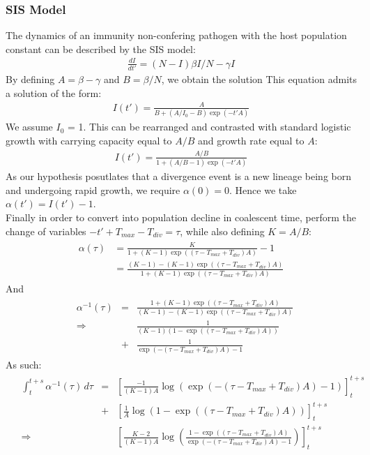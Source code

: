 \documentclass{report}
\theoremstyle{definition}
\begin{document}
\subsubsection{SIS Model}
The dynamics of an immunity non-confering pathogen with the host population constant can be described by the SIS model\cite{keeling_introduction_2008}:
\begin{gather}
\frac{dI}{dt'} = (N-I)\beta I/N -\gamma I
\end{gather}
By defining $A=\beta-\gamma$ and $B=\beta/N$, we obtain the solution 
This equation admits a solution of the form:
\begin{gather}
I(t') = \frac{A}{B+(A/I_0-B)\exp(-t'A)}
\end{gather}
We assume $I_0$ = 1.
This can be rearranged and contrasted with standard logistic growth with carrying capacity equal to $A/B$ and growth rate equal to $A$: 
\begin{gather}
I(t') = \frac{A/B}{1+(A/B - 1)\exp(-t'A)}
\end{gather}
As our hypothesis posutlates that a divergence event is a new lineage being born and undergoing rapid growth, we require $\alpha(0) = 0$. Hence we take $\alpha(t') = I(t')-1$.\\
Finally in order to convert into population decline in coalescent time, perform the change of variables $-t'+T_{max} - T_{div} = \tau$, while also defining $K=A/B$:
\begin{gather}
\begin{aligned}
  \alpha(\tau) &= \frac{K}{1+(K - 1)\exp((\tau-T_{max}+T_{div})A)}-1\\
               &= \frac{(K-1)- (K - 1)\exp((\tau-T_{max}+T_{div})A)}{1+(K - 1)\exp((\tau-T_{max}+T_{div})A)}
\end{aligned}
\end{gather}
And
\begin{gather}
\begin{aligned}
&\alpha^{-1}(\tau) &=&  \frac{1+(K - 1)\exp((\tau-T_{max}+T_{div})A)}{(K-1)- (K - 1)\exp((\tau-T_{max}+T_{div})A)}\\
&\Rightarrow&& \frac{1}{(K-1)(1-\exp((\tau-T_{max}+T_{div})A))}\\
&&+& \frac{1}{\exp(-(\tau-T_{max}+T_{div})A)-1}
\end{aligned}
\end{gather}
As such:
\begin{gather}
\begin{aligned}
&\int_t^{t+s}{\alpha^{-1}(\tau)\,d\tau}&=& \left[\frac{-1}{(K-1)A}\log(\exp(-(\tau-T_{max}+T_{div})A)-1)\right]_t^{t+s}\\
&&+&\left[\frac{1}{A}\log(1-\exp((\tau-T_{max}+T_{div})A))\right]_t^{t+s}\\
&\Rightarrow&&\left[\frac{K-2}{(K-1)A}\log(\frac{1-\exp((\tau-T_{max}+T_{div})A)}{\exp(-(\tau-T_{max}+T_{div})A)-1})\right]_t^{t+s}
\end{aligned}
\end{gather}
\end{document}
